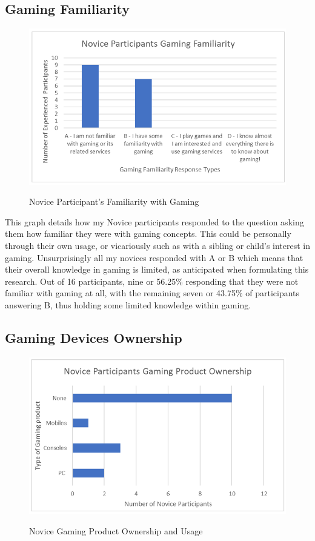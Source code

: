 \subsection{Gaming Familiarity}
\begin{figure}[H]
\includegraphics[width=\linewidth]{Screenshots/DemographicsQuestionaires/noviceQuestionaireData/noviceParticipantsGamingFamiliarity.png}
\label{NoviceGamingFamiliarity}
\caption{Novice Participant's Familiarity with Gaming}
\end{figure}

This graph details how my Novice participants responded to the question asking them how familiar they were with gaming concepts. This could be personally through their own usage, or vicariously such as with a sibling or child's interest in gaming. Unsurprisingly all my novices responded with A or B which means that their overall knowledge in gaming is limited, as anticipated when formulating this research. Out of 16 participants, nine or 56.25\% responding that they were not familiar with gaming at all, with the remaining seven or 43.75\% of participants answering B, thus holding some limited knowledge within gaming. 

\subsection{Gaming Devices Ownership}
\begin{figure}[H]
\includegraphics[width=\linewidth]{Screenshots/DemographicsQuestionaires/noviceQuestionaireData/noviceGamingOwnership.png}
\label{NoviceGamingOwnership}
\caption{Novice Gaming Product Ownership and Usage}
\end{figure}

